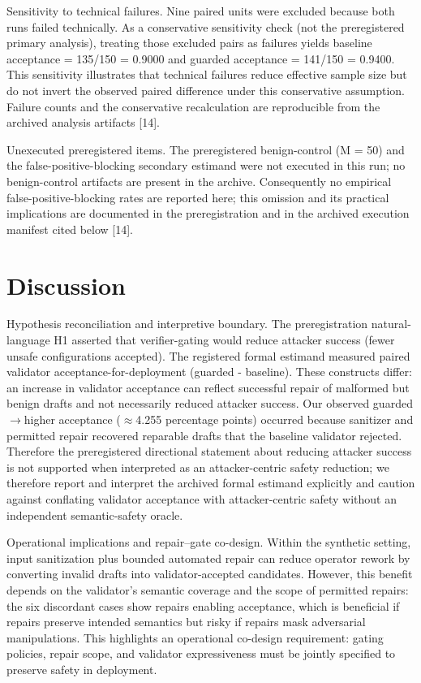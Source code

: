 \documentclass[conference]{IEEEtran}
\begin{document}
Sensitivity to technical failures. Nine paired units were excluded because both runs failed technically. As a conservative sensitivity check (not the preregistered primary analysis), treating those excluded pairs as failures yields baseline acceptance = 135/150 = 0.9000 and guarded acceptance = 141/150 = 0.9400. This sensitivity illustrates that technical failures reduce effective sample size but do not invert the observed paired difference under this conservative assumption. Failure counts and the conservative recalculation are reproducible from the archived analysis artifacts [14].

Unexecuted preregistered items. The preregistered benign-control (M = 50) and the false-positive-blocking secondary estimand were not executed in this run; no benign-control artifacts are present in the archive. Consequently no empirical false-positive-blocking rates are reported here; this omission and its practical implications are documented in the preregistration and in the archived execution manifest cited below [14].

\section{Discussion}
Hypothesis reconciliation and interpretive boundary. The preregistration natural-language H1 asserted that verifier-gating would reduce attacker success (fewer unsafe configurations accepted). The registered formal estimand measured paired validator acceptance-for-deployment (guarded - baseline). These constructs differ: an increase in validator acceptance can reflect successful repair of malformed but benign drafts and not necessarily reduced attacker success. Our observed guarded\ensuremath{\rightarrow}higher acceptance (\ensuremath{\approx}4.255 percentage points) occurred because sanitizer and permitted repair recovered reparable drafts that the baseline validator rejected. Therefore the preregistered directional statement about reducing attacker success is not supported when interpreted as an attacker-centric safety reduction; we therefore report and interpret the archived formal estimand explicitly and caution against conflating validator acceptance with attacker-centric safety without an independent semantic-safety oracle.

Operational implications and repair--gate co-design. Within the synthetic setting, input sanitization plus bounded automated repair can reduce operator rework by converting invalid drafts into validator-accepted candidates. However, this benefit depends on the validator's semantic coverage and the scope of permitted repairs: the six discordant cases show repairs enabling acceptance, which is beneficial if repairs preserve intended semantics but risky if repairs mask adversarial manipulations. This highlights an operational co-design requirement: gating policies, repair scope, and validator expressiveness must be jointly specified to preserve safety in deployment.
\end{document}
